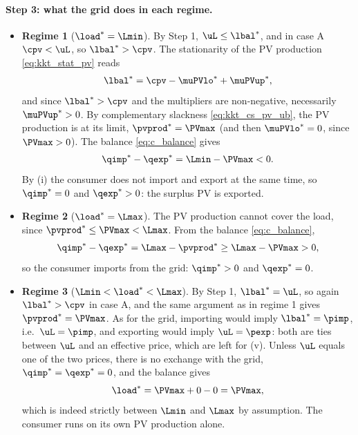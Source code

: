 \paragraph{Step 3: what the grid does in each regime.}
\begin{itemize}
    \item \textbf{Regime 1} (${\load}^* = \Lmin$). By Step 1, $\uL \leq {\lbal}^*$, and in
    case A $\cpv < \uL$, so ${\lbal}^* > \cpv$. The stationarity of the PV production
    \eqref{eq:kkt_stat_pv} reads
    \begin{equation}
        {\lbal}^* = \cpv - {\muPVlo}^* + {\muPVup}^*,
    \end{equation}
    and since ${\lbal}^* > \cpv$ and the multipliers are non-negative, necessarily
    ${\muPVup}^* > 0$. By complementary slackness \eqref{eq:kkt_cs_pv_ub}, the PV production
    is at its limit, ${\pvprod}^* = \PVmax$ (and then ${\muPVlo}^* = 0$, since $\PVmax > 0$).
    The balance \eqref{eq:c_balance} gives
    \begin{equation}
        {\qimp}^* - {\qexp}^* = \Lmin - \PVmax < 0.
    \end{equation}
    By (i) the consumer does not import and export at the same time, so ${\qimp}^* = 0$ and
    ${\qexp}^* > 0$: the surplus PV is exported.
    \item \textbf{Regime 2} (${\load}^* = \Lmax$). The PV production cannot cover the load,
    since ${\pvprod}^* \leq \PVmax < \Lmax$. From the balance \eqref{eq:c_balance},
    \begin{equation}
        {\qimp}^* - {\qexp}^* = \Lmax - {\pvprod}^* \geq \Lmax - \PVmax > 0,
    \end{equation}
    so the consumer imports from the grid: ${\qimp}^* > 0$ and ${\qexp}^* = 0$.
    \item \textbf{Regime 3} ($\Lmin < {\load}^* < \Lmax$). By Step 1, ${\lbal}^* = \uL$, so
    again ${\lbal}^* > \cpv$ in case A, and the same argument as in regime 1 gives
    ${\pvprod}^* = \PVmax$. As for the grid, importing would imply ${\lbal}^* = \pimp$, i.e.\
    $\uL = \pimp$, and exporting would imply $\uL = \pexp$: both are ties between $\uL$ and an
    effective price, which are left for (v). Unless $\uL$ equals one of the two prices, there is
    no exchange with the grid, ${\qimp}^* = {\qexp}^* = 0$, and the balance gives
    \begin{equation}
        {\load}^* = \PVmax + 0 - 0 = \PVmax,
    \end{equation}
    which is indeed strictly between $\Lmin$ and $\Lmax$ by assumption. The consumer runs on
    its own PV production alone.
\end{itemize}

